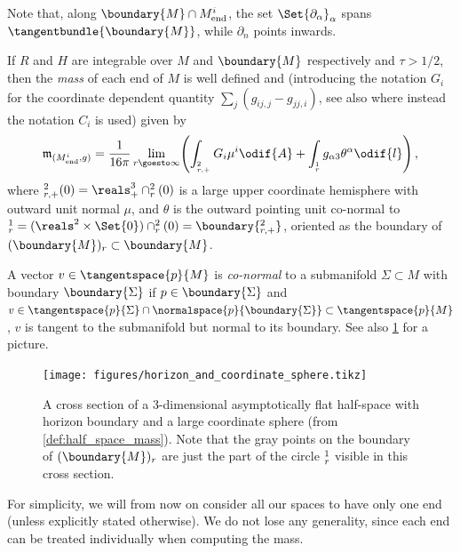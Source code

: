 \documentclass[titlepage,numbers=noenddot,oneside,%
cleardoublepage=empty,paper=a4,fontsize=11pt,%
english,%
]{scrartcl}
\newcommand*{\mathcomma}{\,,}
\let\sphere\relax
\newcommand{\sphere}{\mathbb{S}}
\newcommand{\Mend}{M_{\mathrm{end}}} %
\newcommand{\mass}[2]{\mathfrak{m}_{(#1,#2)}} %
\begin{document}
Note that, along \( \boundary{M}\cap \Mend^i \), the set \( \Set{\partial_\alpha}_\alpha \) spans \( \tangentbundle{\boundary{M}} \), while \( \partial_n \) points inwards.
\begin{definition}\label{def:half_space_mass}
    If \( R \) and \( H \) are integrable over \( M \) and \( \boundary{M} \) respectively and \( \tau>1/2 \), then the \emph{mass} of each end of \( M \) is well defined and (introducing the notation \( G_i \) for the coordinate dependent quantity \( \sum_j (g_{ij,j}-g_{jj,i}) \), see also \cite[Definition 1.1]{almarazPositiveMassTheorem2016} where instead the notation \( C_i \) is used) given by
    \begin{equation*}
        \mass{M_{\mathrm{end}}^i}{g}=\frac{1}{16\pi}\lim_{r \goesto \infty}\Biggl(\int_{\sphere_{r,+}^{2}}G_i\mu^i\odif{A}+\int_{\sphere_r^{1}}g_{\alpha 3}\theta^\alpha\odif{l}\Biggr)\mathcomma
    \end{equation*}
    where \( \sphere_{r,+}^{2}(0)=\reals^3_+\cap \sphere_r^2(0) \) is a large upper coordinate hemisphere with outward unit normal \( \mu \), and \( \theta \) is the outward pointing unit co-normal to \( \sphere_{r}^1=(\reals^2\times \Set{0})\cap \sphere_r^2(0)=\boundary{\sphere_{r,+}^2} \), oriented as the boundary of \( (\boundary{M})_r\subset \boundary{M} \).
\end{definition}
\begin{remark}\label{def:co-normal_vector}
    A vector \( v\in \tangentspace{p}{M} \) is \emph{co-normal} to a submanifold \( \Sigma\subset M \) with boundary \( \boundary{\Sigma} \) if \( p\in \boundary{\Sigma} \) and \( v\in \tangentspace{p}{\Sigma}\cap \normalspace{p}{\boundary{\Sigma}}\subset \tangentspace{p}{M} \), \ie \( v \) is tangent to the submanifold but normal to its boundary. See also \cref{fig:horizon_and_coordinate_sphere} for a picture.
\end{remark}
\begin{figure}
    \centering
    \texttt{[image: figures/horizon\_and\_coordinate\_sphere.tikz]}
    \caption{A cross section of a 3-dimensional asymptotically flat half-space with horizon boundary and a large coordinate sphere (from \cref{def:half_space_mass}). Note that the gray points on the boundary of \( (\boundary{M})_r \) are just the part of the circle \( \sphere^1_r \) visible in this cross section.}
    \label{fig:horizon_and_coordinate_sphere}
\end{figure}
\begin{remark}
    For simplicity, we will from now on consider all our spaces to have only one end (unless explicitly stated otherwise). We do not lose any generality, since each end can be treated individually when computing the mass.
\end{remark}
\end{document}
